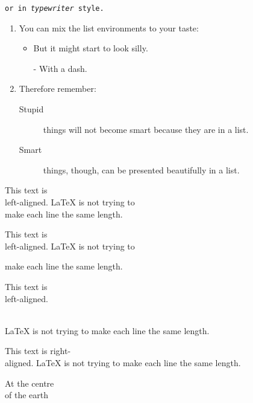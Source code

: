\documentclass[UTF8]{article}
\begin{document}
	\texttt{or in \emph{typewriter} style.}
	
	\flushleft
	\begin{enumerate}
		\item You can mix the list environments to your taste:
		\begin{itemize}
			\item But it might start to look silly. 
			\item[-] With a dash.
		\end{itemize}
	
		\item Therefore remember:
			\begin{description}
				\item[Stupid] things will not become smart because they are in a list.
				\item[Smart] things, though, can be presented beautifully in a list.
			\end{description}
	\end{enumerate}
	
	
	\begin{flushleft}
		This text is \\ left-aligned.
		\LaTeX{} is not trying to \\make each line the same length.
	\end{flushleft}
	
		
	\begin{flushleft}
		This text is \\ left-aligned.
		\LaTeX{} is not trying to \par make each line the same length.
	\end{flushleft}
	
	
	This text is \\ left-aligned.\par
	\indent \\LaTeX{} is not trying to make each line the same length.
	
	\begin{flushright}
		This text is right-\\aligned.
		\LaTeX{} is not trying to make each line the same length.
	\end{flushright}
	
	\begin{center}
		At the centre\\ of the earth
	\end{center}

	
	
\end{document}
